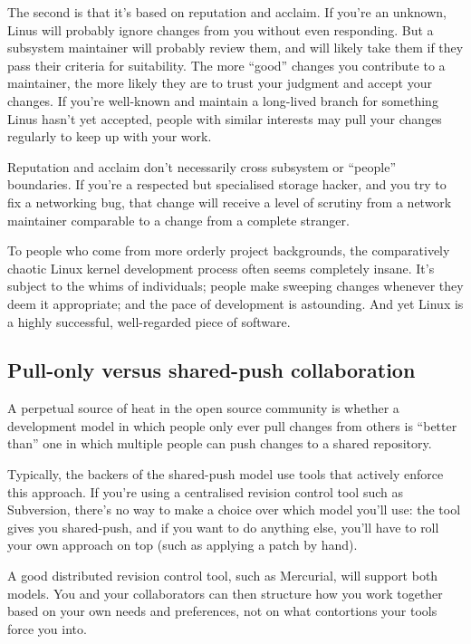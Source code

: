 The second is that it's based on reputation and acclaim.  If you're an
unknown, Linus will probably ignore changes from you without even
responding.  But a subsystem maintainer will probably review them, and
will likely take them if they pass their criteria for suitability.
The more ``good'' changes you contribute to a maintainer, the more
likely they are to trust your judgment and accept your changes.  If
you're well-known and maintain a long-lived branch for something Linus
hasn't yet accepted, people with similar interests may pull your
changes regularly to keep up with your work.

Reputation and acclaim don't necessarily cross subsystem or ``people''
boundaries.  If you're a respected but specialised storage hacker, and
you try to fix a networking bug, that change will receive a level of
scrutiny from a network maintainer comparable to a change from a
complete stranger.

To people who come from more orderly project backgrounds, the
comparatively chaotic Linux kernel development process often seems
completely insane.  It's subject to the whims of individuals; people
make sweeping changes whenever they deem it appropriate; and the pace
of development is astounding.  And yet Linux is a highly successful,
well-regarded piece of software.

\subsection{Pull-only versus shared-push collaboration}

A perpetual source of heat in the open source community is whether a
development model in which people only ever pull changes from others
is ``better than'' one in which multiple people can push changes to a
shared repository.

Typically, the backers of the shared-push model use tools that
actively enforce this approach.  If you're using a centralised
revision control tool such as Subversion, there's no way to make a
choice over which model you'll use: the tool gives you shared-push,
and if you want to do anything else, you'll have to roll your own
approach on top (such as applying a patch by hand).

A good distributed revision control tool, such as Mercurial, will
support both models.  You and your collaborators can then structure
how you work together based on your own needs and preferences, not on
what contortions your tools force you into.

